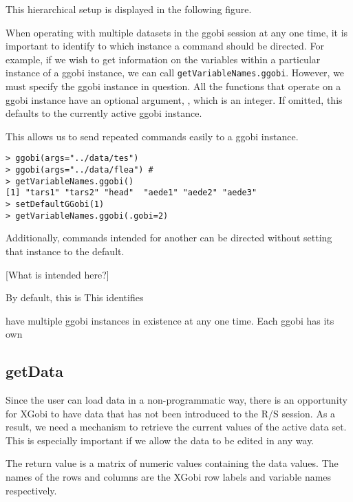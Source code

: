 \documentclass{article}
\def\SFunction#1{{\texttt{\red #1}}}
\begin{document}
This hierarchical setup is displayed in the following
figure.
\begin{center}
\end{center}

When operating with multiple datasets in the ggobi session at any one
time, it is important to identify to which instance a command should
be directed.  For example, if we wish to get information on the
variables within a particular instance of a ggobi instance, we can
call \SFunction{getVariableNames.ggobi}. However, we must
specify the ggobi instance in question. All the functions
that operate on a ggobi instance have an optional argument,
, which is an integer.
If omitted, this defaults to the currently active
ggobi instance.

This allows us to send repeated commands easily to a ggobi instance.
\begin{verbatim}
> ggobi(args="../data/tes") 
> ggobi(args="../data/flea") #
> getVariableNames.ggobi()
[1] "tars1" "tars2" "head"  "aede1" "aede2" "aede3"
> setDefaultGGobi(1)
> getVariableNames.ggobi(.gobi=2)
\end{verbatim}
Additionally, commands intended for another can be directed without
setting that instance to the default.

[What is intended here?]

By default, this is 
This identifies 


have multiple ggobi
instances in existence at any one time.
Each ggobi has its own


\subsection{getData}
Since the user can load data in a non-programmatic way, there is an
opportunity for XGobi to have data that has not been introduced to the
R/S session.  As a result, we need a mechanism to retrieve the current
values of the active data set.  This is especially important if we
allow the data to be edited in any way.

The return value is a matrix of numeric values containing the data
values.  The names of the rows and columns are the XGobi row labels
and variable names respectively.
\end{document}
